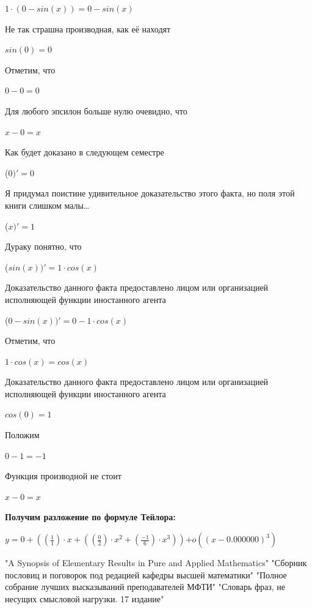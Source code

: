 \documentclass[12pt,a4paper,fleqn]{article}
\begin{document}
\begin{center}
$1 \cdot (0-sin(x)) = 0-sin(x)$\end{center}
Не так страшна производная, как её находят\cite{link2}

\begin{center}$sin(0) = 0$\end{center}
Отметим, что

\begin{center}$0-0 = 0$\end{center}
Для любого эпсилон больше нулю очевидно, что

\begin{center}
$x-0 = x$\end{center}
Как будет доказано в следующем семестре

\begin{center}
 ($0)'
  = 0$\end{center}
Я придумал поистине удивительное доказательство этого факта, но поля этой книги слишком малы\ldots

\begin{center}
 ($x)'
  = 1$\end{center}
Дураку понятно, что

\begin{center}
 ($sin(x))'
  = 1 \cdot cos(x)$\end{center}
Доказательство данного факта предоставлено лицом или организацией исполняющей функции иностанного агента

\begin{center}
 ($0-sin(x))'
  = 0-1 \cdot cos(x)$\end{center}
Отметим, что

\begin{center}
$1 \cdot cos(x) = cos(x)$\end{center}
Доказательство данного факта предоставлено лицом или организацией исполняющей функции иностанного агента

\begin{center}$cos(0) = 1$\end{center}
Положим

\begin{center}$0-1 = -1$\end{center}
Функция производной не стоит\cite{link2}

\begin{center}
$x-0 = x$\end{center}
\textbf{\LARGE{Получим разложение по формуле Тейлора:}}
\begin{center}
$y = $$0+((\frac{1}{1}) \cdot x+((\frac{0}{2}) \cdot x^{2}+(\frac{-1}{6}) \cdot x^{3}))$$ + o((x - 0.000000)^{3})$
\end{center}
\newpage\begin{thebibliography}{}
  "A Synopsis of Elementary Results in Pure and Applied Mathematics"
  "Сборник пословиц и поговорок под редацией кафедры высшей математики"
  "Полное собрание лучших высказываний преподавателей МФТИ"
  "Словарь фраз, не несущих смысловой нагрузки. 17 издание"
\end{thebibliography}
\end{document}

